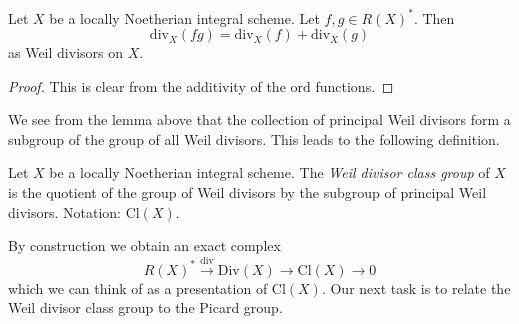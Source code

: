 \begin{lemma}
\label{lemma-div-additive}
Let $X$ be a locally Noetherian integral scheme. Let $f, g \in R(X)^*$. Then
$$
\text{div}_X(fg) = \text{div}_X(f) + \text{div}_X(g)
$$
as Weil divisors on $X$.
\end{lemma}

\begin{proof}
This is clear from the additivity of the $\text{ord}$ functions.
\end{proof}

\noindent
We see from the lemma above that the collection of principal Weil divisors
form a subgroup of the group of all Weil divisors. This leads to the following
definition.

\begin{definition}
\label{definition-class-group}
Let $X$ be a locally Noetherian integral scheme. The
{\it Weil divisor class group} of $X$ is the quotient of
the group of Weil divisors by the subgroup of principal Weil divisors.
Notation: $\text{Cl}(X)$.
\end{definition}

\noindent
By construction we obtain an exact complex
\begin{equation}
\label{equation-Weil-divisor-class}
R(X)^* \xrightarrow{\text{div}} \text{Div}(X) \to \text{Cl}(X) \to 0
\end{equation}
which we can think of as a presentation of $\text{Cl}(X)$. Our next task
is to relate the Weil divisor class group to the Picard group.





